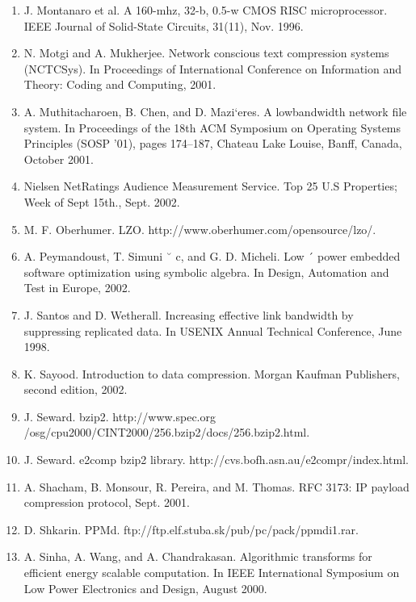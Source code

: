 \documentclass{article}
\begin{document}
\begin{enumerate}
	\item J. Montanaro et al. A 160-mhz, 32-b, 0.5-w CMOS RISC
	microprocessor. IEEE Journal of Solid-State Circuits,
	31(11), Nov. 1996.

	\item N. Motgi and A. Mukherjee. Network conscious text
	compression systems (NCTCSys). In Proceedings of
	International Conference on Information and Theory:
	Coding and Computing, 2001.

	\item A. Muthitacharoen, B. Chen, and D. Mazi`eres. A lowbandwidth network file system. In Proceedings of the
	18th ACM Symposium on Operating Systems Principles (SOSP ’01), pages 174–187, Chateau Lake Louise,
	Banff, Canada, October 2001.

	\item Nielsen NetRatings Audience Measurement Service. Top
	25 U.S Properties; Week of Sept 15th., Sept. 2002.
	
	\item M. F. Oberhumer. LZO.
	http://www.oberhumer.com/opensource/lzo/.

	\item A. Peymandoust, T. Simuni ˘ c, and G. D. Micheli. Low ´
	power embedded software optimization using symbolic
	algebra. In Design, Automation and Test in Europe, 2002.

	\item J. Santos and D. Wetherall. Increasing effective link
	bandwidth by suppressing replicated data. In USENIX
	Annual Technical Conference, June 1998.

	\item K. Sayood. Introduction to data compression. Morgan
	Kaufman Publishers, second edition, 2002.

	\item J. Seward. bzip2. http://www.spec.org
	/osg/cpu2000/CINT2000/256.bzip2/docs/256.bzip2.html.

	\item J. Seward. e2comp bzip2 library.
	http://cvs.bofh.asn.au/e2compr/index.html.

	\item A. Shacham, B. Monsour, R. Pereira, and M. Thomas.
	RFC 3173: IP payload compression protocol, Sept. 2001.

	\item D. Shkarin. PPMd.
	ftp://ftp.elf.stuba.sk/pub/pc/pack/ppmdi1.rar.

	\item A. Sinha, A. Wang, and A. Chandrakasan. Algorithmic
	transforms for efficient energy scalable computation. In
	IEEE International Symposium on Low Power Electronics and Design, August 2000.


\end{enumerate}
\end{document}

